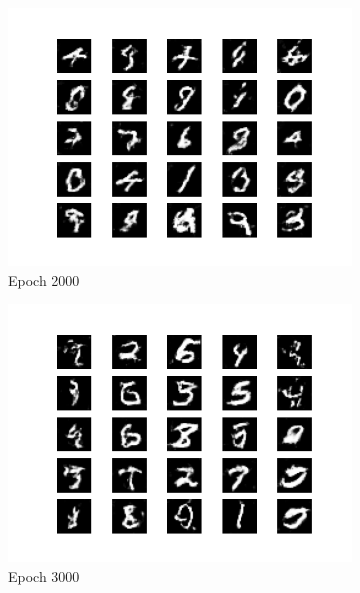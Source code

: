 \documentclass[conference]{IEEEtran}
\begin{document}
\begin{figure}[htbp]
    \centering
     \begin{subfigure}[b]{\columnwidth}
         \centering
         \includegraphics[width=\textwidth,keepaspectratio]{DCGAN_2000.png}
         \caption{Epoch 2000}
         \label{fig:dcgan2000}
     \end{subfigure}
     \begin{subfigure}[b]{\columnwidth}
         \centering
         \includegraphics[width=\textwidth,keepaspectratio]{DCGAN_3000.png}
         \caption{Epoch 3000}
         \label{fig:dcgan3000}
     \end{subfigure}
     \begin{subfigure}[b]{\columnwidth}

\end{subfigure}
\end{figure}
\end{document}
